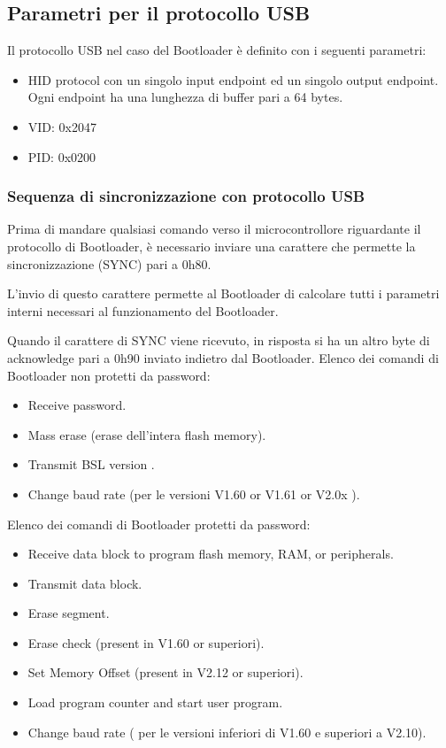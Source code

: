 \documentclass[LaM,binding=0.6cm,oneside]{../sapthesis}
\begin{document}
\subsection{Parametri per il protocollo USB}
Il protocollo USB nel caso del Bootloader è definito con i seguenti parametri:

\begin{itemize}
\item HID protocol con un singolo input endpoint ed un singolo output endpoint. Ogni endpoint ha una lunghezza di buffer pari a 64 bytes.
\item  VID: 0x2047
\item  PID: 0x0200
\end{itemize}


\subsubsection{Sequenza di sincronizzazione con protocollo USB}

Prima di mandare qualsiasi comando verso il microcontrollore riguardante il protocollo di Bootloader, è necessario inviare una carattere che permette la sincronizzazione (SYNC) pari a 0h80.

L’invio di questo carattere permette al Bootloader di calcolare tutti i parametri interni necessari al funzionamento del Bootloader.

Quando il carattere di SYNC viene ricevuto, in risposta si ha un altro byte di acknowledge pari a 0h90 inviato indietro dal Bootloader.
\vspace{0.5cm}
Elenco dei comandi di Bootloader non protetti da password:
\begin{itemize}
\item Receive password.
\item Mass erase (erase dell’intera flash memory).
\item Transmit BSL version .
\item Change baud rate  (per le versioni V1.60 or V1.61 or V2.0x ).
\end{itemize}
\vspace{0.5cm}
Elenco dei comandi di Bootloader protetti da password:

\begin{itemize}
\item Receive data block to program flash memory, RAM, or peripherals.
\item Transmit data block.
\item Erase segment.
\item Erase check (present in V1.60 or superiori).
\item Set Memory Offset (present in V2.12 or superiori).
\item Load program counter and start user program.
\item Change baud rate ( per le versioni inferiori di V1.60 e superiori a V2.10).
\end{itemize}
\end{document}
